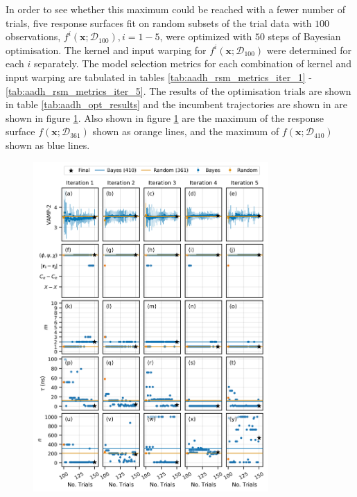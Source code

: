 In order to see whether this maximum could be reached with a fewer number of trials, five response surfaces fit on random subsets of the trial data with $100$ observations, $f^{i}(\mathbf{x};\mathcal{D}_{100}), i = 1 - 5$, were optimized with $50$ steps of Bayesian optimisation. The kernel and input warping for $f^{i}(\mathbf{x};\mathcal{D}_{100})$ were determined for each $i$ separately. The model selection metrics for each combination of kernel and input warping are tabulated in tables \ref{tab:aadh_rsm_metrics_iter_1} - \ref{tab:aadh_rsm_metrics_iter_5}. The results of the optimisation trials are shown in table \ref{tab:aadh_opt_results} and the incumbent trajectories are shown in are shown in figure \ref{fig:aadh_opt_traj_d}. Also shown in figure \ref{fig:aadh_opt_traj_d} are the maximum of the response surface $f(\mathbf{x};\mathcal{D}_{361})$ shown as orange lines, and the maximum of $f(\mathbf{x};\mathcal{D}_{410})$ shown as blue lines. 

\begin{figure}[p]
    \centering
    \includegraphics[width=0.8\textwidth]{chapters/msm_optimization/figures/aadh_opt_traj_act_s_d.png}
    
    \label{fig:aadh_opt_traj_d}
\end{figure}

